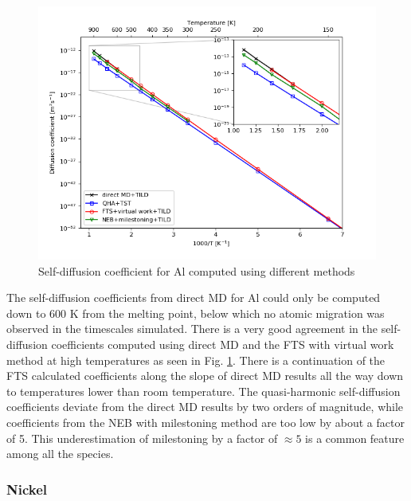 \documentclass{article}
\begin{document}
\begin{figure}[htp]
\centering
\includegraphics[scale=0.65]{al_self_diffusion}
\caption{Self-diffusion coefficient for Al computed using different methods}
\label{fig:10}
\end{figure}

The self-diffusion coefficients from direct MD for Al could only be computed down to 600 K from the melting point, below which no atomic migration was observed in the timescales simulated. There is a very good agreement in the self-diffusion coefficients computed using direct MD and the FTS with virtual work method at high temperatures as seen in Fig. \ref{fig:10}. There is a continuation of the FTS calculated coefficients along the slope of direct MD results all the way down to temperatures lower than room temperature. The quasi-harmonic self-diffusion coefficients deviate from the direct MD results by two orders of magnitude, while coefficients from the NEB with milestoning method are too low by about a factor of 5. This underestimation of milestoning by a factor of $\approx 5$ is a common feature among all the species.

\subsubsection{Nickel}
\end{document}
